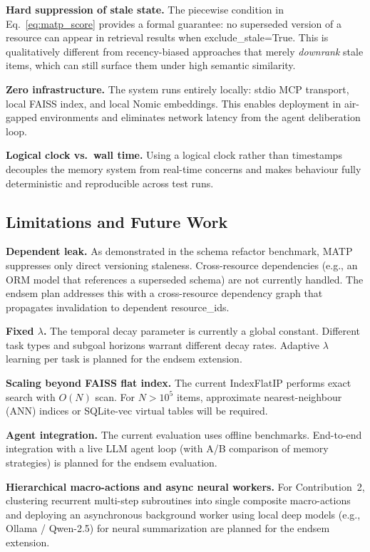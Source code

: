 \documentclass[lettersize,journal]{IEEEtran}
\begin{document}
\textbf{Hard suppression of stale state.} The piecewise condition in Eq.~\eqref{eq:matp_score} provides a formal guarantee: no superseded version of a resource can appear in retrieval results when exclude\_stale=True. This is qualitatively different from recency-biased approaches that merely \emph{downrank} stale items, which can still surface them under high semantic similarity.

\textbf{Zero infrastructure.} The system runs entirely locally: stdio MCP transport, local FAISS index, and local Nomic embeddings. This enables deployment in air-gapped environments and eliminates network latency from the agent deliberation loop.

\textbf{Logical clock vs.\ wall time.} Using a logical clock rather than timestamps decouples the memory system from real-time concerns and makes behaviour fully deterministic and reproducible across test runs.

\subsection{Limitations and Future Work}

\textbf{Dependent leak.} As demonstrated in the schema refactor benchmark, MATP suppresses only direct versioning staleness. Cross-resource dependencies (e.g., an ORM model that references a superseded schema) are not currently handled. The endsem plan addresses this with a cross-resource dependency graph that propagates invalidation to dependent resource\_ids.

\textbf{Fixed $\lambda$.} The temporal decay parameter is currently a global constant. Different task types and subgoal horizons warrant different decay rates. Adaptive $\lambda$ learning per task is planned for the endsem extension.

\textbf{Scaling beyond FAISS flat index.} The current IndexFlatIP performs exact search with $O(N)$ scan. For $N > 10^5$ items, approximate nearest-neighbour (ANN) indices or SQLite-vec virtual tables will be required.

\textbf{Agent integration.} The current evaluation uses offline benchmarks. End-to-end integration with a live LLM agent loop (with A/B comparison of memory strategies) is planned for the endsem evaluation.

\textbf{Hierarchical macro-actions and async neural workers.} For Contribution~2, clustering recurrent multi-step subroutines into single composite macro-actions and deploying an asynchronous background worker using local deep models (e.g., Ollama / Qwen-2.5) for neural summarization are planned for the endsem extension.
\end{document}
